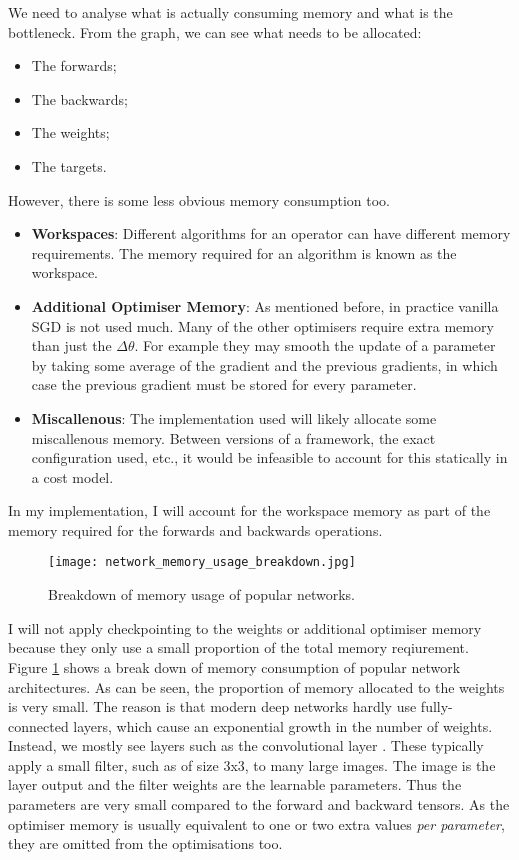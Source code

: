 We need to analyse what is actually consuming memory and what is the bottleneck. From the graph, we can see what needs to be allocated:
\begin{itemize}[topsep=0.1em]
    \item The forwards;
    \item The backwards;
    \item The weights;
    \item The targets.
\end{itemize}
However, there is some less obvious memory consumption too.
\begin{itemize}[topsep=0.1em]
    \item \textbf{Workspaces}: Different algorithms for an operator can have different memory requirements. The memory required for an algorithm is known as the workspace.
    \item \textbf{Additional Optimiser Memory}: As mentioned before, in practice vanilla SGD is not used much. Many of the other optimisers require extra memory than just the \(\Delta\theta\). For example they may smooth the update of a parameter by taking some average of the gradient and the previous gradients, in which case the previous gradient must be stored for every parameter.
    \item \textbf{Miscallenous}: The implementation used will likely allocate some miscallenous memory. Between versions of a framework, the exact configuration used, etc., it would be infeasible to account for this statically in a cost model.
\end{itemize}

In my implementation, I will account for the workspace memory as part of the memory required for the forwards and backwards operations.

\begin{figure}[htb]
    \centering
    \texttt{[image: network\_memory\_usage\_breakdown.jpg]}
    \caption{Breakdown of memory usage of popular networks. \cite[Figure~4]{Rhu2016}}
    \label{fig:2-memory-breakdown}
\end{figure}

I will not apply checkpointing to the weights or additional optimiser memory because they only use a small proportion of the total memory reqiurement.
Figure \ref{fig:2-memory-breakdown} shows a break down of memory consumption of popular network architectures.
As can be seen, the proportion of memory allocated to the weights is very small.
The reason is that modern deep networks hardly use fully-connected layers,
which cause an exponential growth in the number of weights.
Instead, we mostly see layers such as the convolutional layer .
These typically apply a small filter, such as of size 3x3, to many large images. 
The image is the layer output and the filter weights are the learnable parameters.
Thus the parameters are very small compared to the forward and backward tensors.
As the optimiser memory is usually equivalent to one or two extra values \textit{per parameter},
they are omitted from the optimisations too.

